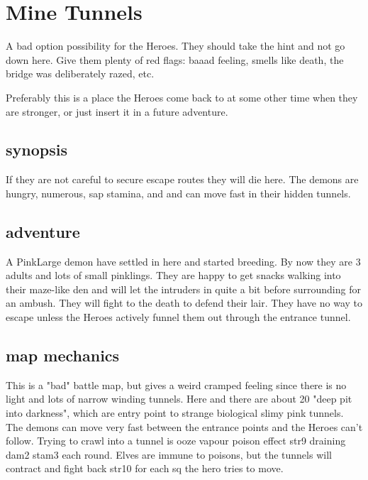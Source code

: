 \section*{Mine Tunnels}
A bad option possibility for the Heroes. They should take the hint and not go down here. Give them plenty of red flags: baaad feeling, smells like death, the bridge was deliberately razed, etc.

Preferably this is a place the Heroes come back to at some other time when they are stronger, or just insert it in a future adventure.


\subsection*{synopsis}
If they are not careful to secure escape routes they will die here. The demons are hungry, numerous, sap stamina, and and can move fast in their hidden tunnels.


\subsection*{adventure}
A PinkLarge demon have settled in here and started breeding. By now they are 3 adults and lots of small pinklings. They are happy to get snacks walking into their maze-like den and will let the intruders in quite a bit before surrounding for an ambush. They will fight to the death to defend their lair. They have no way to escape unless the Heroes actively funnel them out through the entrance tunnel.


\subsection*{map mechanics}
This is a "bad" battle map, but gives a weird cramped feeling since there is no light and lots of narrow winding tunnels. Here and there are about 20 "deep pit into darkness", which are entry point to strange biological slimy pink tunnels. The demons can move very fast between the entrance points and the Heroes can't follow. Trying to crawl into a tunnel is ooze vapour poison effect str9 draining dam2 stam3 each round. Elves are immune to poisons, but the tunnels will contract and fight back str10 for each sq the hero tries to move.

